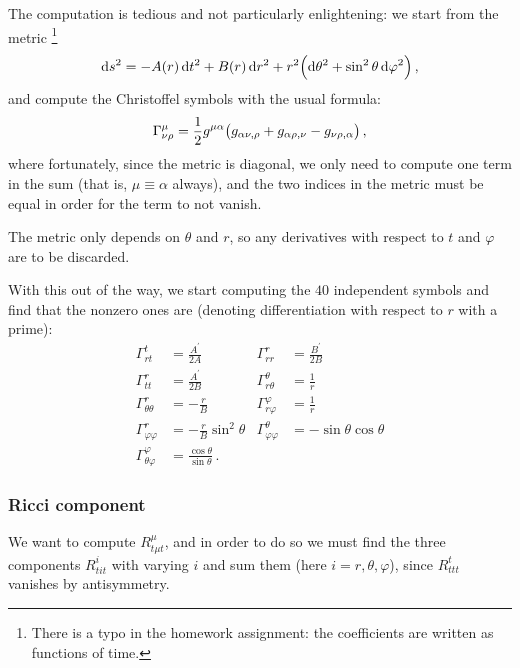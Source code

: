 \documentclass[main.tex]{subfiles}
\begin{document}
The computation is tedious and not particularly enlightening: we start from the metric
\footnote{There is a typo in the homework assignment: the coefficients are written as functions of time.}
%
\begin{align}
  \dd{s^2} = - A(r) \dd{t^2}
  + B(r) \dd{r^2}
  + r^2 \qty(\dd{\theta^2} + \sin^2\theta \dd{\varphi^2})
\,,
\end{align}
%
and compute the Christoffel symbols with the usual formula: 
%
\begin{align}
  \Gamma^{\mu }_{\nu \rho } =
  \frac{1}{2} g^{\mu \alpha }\qty(g_{\alpha \nu , \rho }
  + g_{\alpha \rho, \nu } - g_{\nu \rho , \alpha })
\,,
\end{align}
%
where fortunately, since the metric is diagonal, we only need to compute one term in the sum (that is, \(\mu \equiv \alpha \) always), and the two indices in the metric must be equal in order for the term to not vanish. 

The metric only depends on \(\theta \) and \(r\), so any derivatives with respect to \(t\) and \(\varphi \) are to be discarded. 

With this out of the way, we start computing the \(40\) independent symbols and find that the nonzero ones are (denoting differentiation with respect to \(r\) with a prime): 
%
\begin{subequations} \label{eq:schwarzschild-christoffel}
\begin{align}
  \Gamma^{t}_{rt} &= \frac{A^{\prime }}{2A}  &
  \Gamma^{r}_{rr} &= \frac{B^{\prime }}{2B}  \\
  \Gamma^{r}_{tt} &= \frac{A^{\prime }}{2B}  &
  \Gamma^{\theta }_{r \theta } &= \frac{1}{r}  \\
  \Gamma^{r}_{\theta \theta } &= -\frac{r}{B}  &
  \Gamma^{\varphi }_{r \varphi } &= \frac{1}{r}  \\
  \Gamma^{r}_{\varphi \varphi } &= - \frac{r}{B} \sin^2 \theta  &
  \Gamma^{\theta }_{\varphi \varphi } &= - \sin \theta \cos \theta  \\
  \Gamma^{\varphi }_{\theta \varphi } &= \frac{\cos \theta }{\sin \theta }
\,.
\end{align}
\end{subequations}

\subsubsection{Ricci component}

We want to compute \(R^{\mu }_{t \mu t }\), and in order to do so we must find the three components \(R^{i}_{tit}\) with varying \(i\) and sum them (here \(i = r, \theta,\varphi \)), since \(R^{t}_{ttt}\) vanishes by antisymmetry. 
\end{document}
